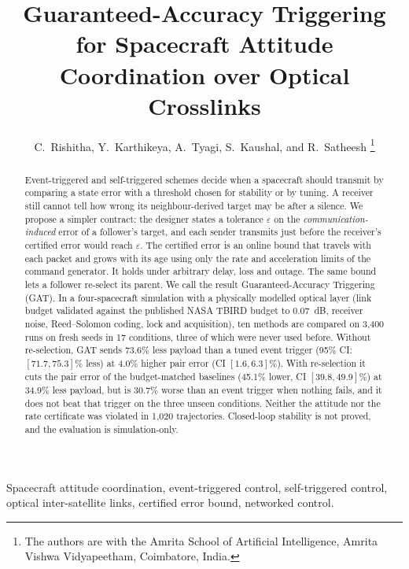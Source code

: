 \documentclass[journal]{IEEEtran}
\begin{document}
\title{Guaranteed-Accuracy Triggering for Spacecraft Attitude Coordination over Optical Crosslinks}

\author{C.~Rishitha, Y.~Karthikeya, A.~Tyagi, S.~Kaushal, and R.~Satheesh%
\thanks{The authors are with the Amrita School of Artificial Intelligence, Amrita Vishwa Vidyapeetham, Coimbatore, India.}}

\maketitle

\begin{abstract}
Event-triggered and self-triggered schemes decide when a spacecraft should transmit by comparing a state error with a threshold chosen for stability or by tuning. A receiver still cannot tell how wrong its neighbour-derived target may be after a silence. We propose a simpler contract: the designer states a tolerance $\varepsilon$ on the \emph{communication-induced} error of a follower's target, and each sender transmits just before the receiver's certified error would reach $\varepsilon$. The certified error is an online bound that travels with each packet and grows with its age using only the rate and acceleration limits of the command generator. It holds under arbitrary delay, loss and outage. The same bound lets a follower re-select its parent. We call the result Guaranteed-Accuracy Triggering (GAT). In a four-spacecraft simulation with a physically modelled optical layer (link budget validated against the published NASA TBIRD budget to 0.07~dB, receiver noise, Reed--Solomon coding, lock and acquisition), ten methods are compared on 3{,}400 runs on fresh seeds in 17 conditions, three of which were never used before. Without re-selection, GAT sends 73.6\% less payload than a tuned event trigger (95\% CI: $[71.7,75.3]\%$ less) at 4.0\% higher pair error (CI $[1.6,6.3]\%$). With re-selection it cuts the pair error of the budget-matched baselines (45.1\% lower, CI $[39.8,49.9]\%$) at 34.9\% less payload, but is 30.7\% worse than an event trigger when nothing fails, and it does not beat that trigger on the three unseen conditions. Neither the attitude nor the rate certificate was violated in 1{,}020 trajectories. Closed-loop stability is not proved, and the evaluation is simulation-only.
\end{abstract}

\begin{IEEEkeywords}
Spacecraft attitude coordination, event-triggered control, self-triggered control, optical inter-satellite links, certified error bound, networked control.
\end{IEEEkeywords}
\end{document}
